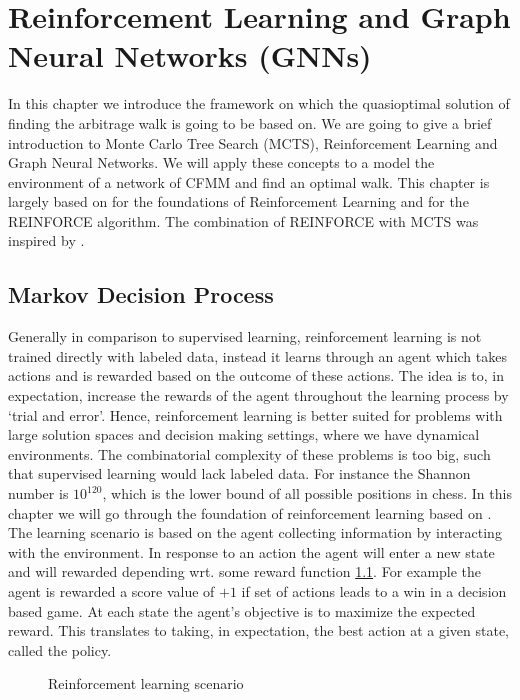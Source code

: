 \chapter{Reinforcement Learning and Graph Neural Networks (GNNs)}
In this chapter we introduce the framework on which the quasioptimal solution
of finding the arbitrage walk is going to be based on. We are going to give a
brief introduction to Monte Carlo Tree Search (MCTS), Reinforcement Learning
and Graph Neural Networks. We will apply these concepts to a model the
environment of a network of CFMM and find an optimal walk. This chapter is
largely based on \cite[Chapter17]{ml_foundations} for the foundations of
Reinforcement Learning and \cite{sutton_barto} for the REINFORCE algorithm.
The combination of REINFORCE with MCTS was inspired by \cite{alphazero}.
\section{Markov Decision Process}
Generally in comparison to supervised learning, reinforcement learning is not
trained directly with labeled data, instead it learns through an agent which takes
actions and is rewarded based on the outcome of these actions. The idea is
to, in expectation, increase the rewards of the agent throughout the learning
process by `trial and error'. Hence, reinforcement learning
is better suited for problems with large solution spaces and decision making
settings, where we have dynamical environments. The combinatorial complexity
of these problems is too big, such that supervised learning would lack
labeled data. For instance the Shannon number is $10^{120}$, which is the
lower bound of all possible positions in chess. In this chapter we will go
through the foundation of reinforcement learning based on
\cite[Chapter~17]{ml_foundations}.
The learning scenario is based on the agent collecting information by
interacting with the environment. In response to an action the agent will
enter a new state and will rewarded depending wrt. some reward function
\ref{fig: 1}. For example the agent is rewarded a score value of $+1$ if set
of actions leads to a win in a decision based game. At each state the agent's
objective is to maximize the expected reward. This translates to taking, in
expectation, the best action at a given state, called the policy.
\begin{figure}[H]
    \centering
    \caption{Reinforcement learning scenario \label{fig: 1}}
\end{figure}
